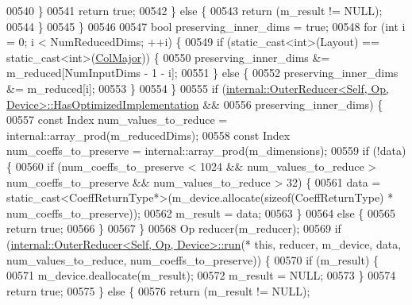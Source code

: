 \begin{DoxyCode}
00540           \}
00541           \textcolor{keywordflow}{return} \textcolor{keyword}{true};
00542         \} \textcolor{keywordflow}{else} \{
00543           \textcolor{keywordflow}{return} (m\_result != NULL);
00544         \}
00545       \}
00546 
00547       \textcolor{keywordtype}{bool} preserving\_inner\_dims = \textcolor{keyword}{true};
00548       \textcolor{keywordflow}{for} (\textcolor{keywordtype}{int} i = 0; i < NumReducedDims; ++i) \{
00549         \textcolor{keywordflow}{if} (static\_cast<int>(Layout) == static\_cast<int>(\hyperlink{group__enums_ggaacded1a18ae58b0f554751f6cdf9eb13a0cbd4bdd0abcfc0224c5fcb5e4f6669a}{ColMajor})) \{
00550           preserving\_inner\_dims &= m\_reduced[NumInputDims - 1 - i];
00551         \} \textcolor{keywordflow}{else} \{
00552           preserving\_inner\_dims &= m\_reduced[i];
00553         \}
00554       \}
00555       \textcolor{keywordflow}{if} (\hyperlink{struct_eigen_1_1internal_1_1_outer_reducer}{internal::OuterReducer<Self, Op, Device>::HasOptimizedImplementation}
       &&
00556           preserving\_inner\_dims) \{
00557         \textcolor{keyword}{const} Index num\_values\_to\_reduce = internal::array\_prod(m\_reducedDims);
00558         \textcolor{keyword}{const} Index num\_coeffs\_to\_preserve = internal::array\_prod(m\_dimensions);
00559         \textcolor{keywordflow}{if} (!data) \{
00560           \textcolor{keywordflow}{if} (num\_coeffs\_to\_preserve < 1024 && num\_values\_to\_reduce > num\_coeffs\_to\_preserve && 
      num\_values\_to\_reduce > 32) \{
00561             data = \textcolor{keyword}{static\_cast<}CoeffReturnType*\textcolor{keyword}{>}(m\_device.allocate(\textcolor{keyword}{sizeof}(CoeffReturnType) * 
      num\_coeffs\_to\_preserve));
00562             m\_result = data;
00563           \}
00564           \textcolor{keywordflow}{else} \{
00565             \textcolor{keywordflow}{return} \textcolor{keyword}{true};
00566           \}
00567         \}
00568         Op reducer(m\_reducer);
00569         \textcolor{keywordflow}{if} (\hyperlink{struct_eigen_1_1internal_1_1_outer_reducer}{internal::OuterReducer<Self, Op, Device>::run}(*\textcolor{keyword}{
      this}, reducer, m\_device, data, num\_values\_to\_reduce, num\_coeffs\_to\_preserve)) \{
00570           \textcolor{keywordflow}{if} (m\_result) \{
00571             m\_device.deallocate(m\_result);
00572             m\_result = NULL;
00573           \}
00574           \textcolor{keywordflow}{return} \textcolor{keyword}{true};
00575         \} \textcolor{keywordflow}{else} \{
00576           \textcolor{keywordflow}{return} (m\_result != NULL);

\end{DoxyCode}

